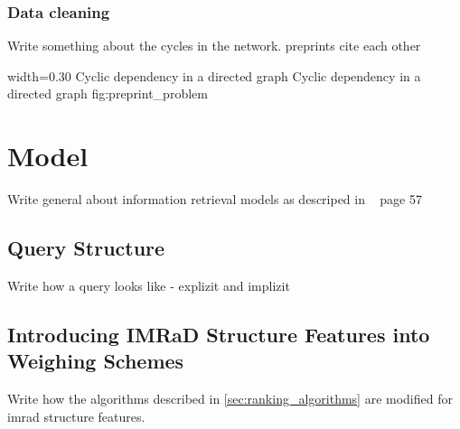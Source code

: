 \subsubsection{Data cleaning}
\label{subsubsec:data_cleaning}
Write something about the cycles in the network. preprints cite each other

      {width=0.30\textwidth}
      {Cyclic dependency in a directed graph}
      {Cyclic dependency in a directed graph}
      {fig:preprint_problem}

\section{Model}
\label{sec:model}

Write general about information retrieval models as descriped in ~\cite{ModernInvormationRetrieval1999} page 57

\subsection{Query Structure}

Write how a query looks like - explizit and implizit

\subsection{Introducing IMRaD Structure Features into Weighing Schemes}

Write how the algorithms described in \cref{sec:ranking_algorithms} are modified for imrad structure features.
